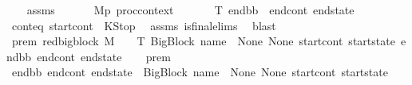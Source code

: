 \begin{isabellebody}
%
\isadelimproof
\ \ %
\endisadelimproof
%
\isatagproof
{}\isamarkupfalse%
\ assms\ \isanewline
{}\isamarkupfalse%
\ {\isacharminus}{\kern0pt}\isanewline
\ \ \isamarkupfalse%
\ M{\isacharcolon}{\kern0pt}{\isacharcolon}{\kern0pt}{\isachardoublequoteopen}{\isacharprime}{\kern0pt}p\ proc{\isacharunderscore}{\kern0pt}context{\isachardoublequoteclose}\isanewline
\ \ \isamarkupfalse%
\ {\isasymLambda}\ {\isasymGamma}\ {\isasymOmega}\ T\ end{\isacharunderscore}{\kern0pt}bb\ \ end{\isacharunderscore}{\kern0pt}cont\ end{\isacharunderscore}{\kern0pt}state\isanewline
\ \ \isamarkupfalse%
\ cont{\isacharunderscore}{\kern0pt}eq{\isacharcolon}{\kern0pt}\ {\isachardoublequoteopen}start{\isacharunderscore}{\kern0pt}cont\ {\isacharequal}{\kern0pt}\ KStop{\isachardoublequoteclose}\ \isamarkupfalse%
\ assms\ is{\isacharunderscore}{\kern0pt}final{\isachardot}{\kern0pt}elims{\isacharparenleft}{\kern0pt}{}{\isacharparenright}{\kern0pt}\ \isamarkupfalse%
\ blast\ \ \isanewline
\ \ \isamarkupfalse%
\ prem{}{\isacharcolon}{\kern0pt}\ {\isachardoublequoteopen}{\isacharparenleft}{\kern0pt}red{\isacharunderscore}{\kern0pt}bigblock\ M\ {\isasymLambda}\ {\isasymGamma}\ {\isasymOmega}\ T\ {\isacharparenleft}{\kern0pt}{\isacharparenleft}{\kern0pt}BigBlock\ name\ {\isacharbrackleft}{\kern0pt}{\isacharbrackright}{\kern0pt}\ None\ None{\isacharparenright}{\kern0pt}{\isacharcomma}{\kern0pt}\ start{\isacharunderscore}{\kern0pt}cont{\isacharcomma}{\kern0pt}\ start{\isacharunderscore}{\kern0pt}state{\isacharparenright}{\kern0pt}\ {\isacharparenleft}{\kern0pt}end{\isacharunderscore}{\kern0pt}bb{\isacharcomma}{\kern0pt}\ end{\isacharunderscore}{\kern0pt}cont{\isacharcomma}{\kern0pt}\ end{\isacharunderscore}{\kern0pt}state{\isacharparenright}{\kern0pt}{\isacharparenright}{\kern0pt}{\isachardoublequoteclose}\isanewline
\ \ \isamarkupfalse%
\ prem{}\ \isamarkupfalse%
\ {\isachardoublequoteopen}{\isacharparenleft}{\kern0pt}{\isacharparenleft}{\kern0pt}end{\isacharunderscore}{\kern0pt}bb{\isacharcomma}{\kern0pt}\ end{\isacharunderscore}{\kern0pt}cont{\isacharcomma}{\kern0pt}\ end{\isacharunderscore}{\kern0pt}state{\isacharparenright}{\kern0pt}\ {\isacharequal}{\kern0pt}\ {\isacharparenleft}{\kern0pt}{\isacharparenleft}{\kern0pt}BigBlock\ name\ {\isacharbrackleft}{\kern0pt}{\isacharbrackright}{\kern0pt}\ None\ None{\isacharparenright}{\kern0pt}{\isacharcomma}{\kern0pt}\ start{\isacharunderscore}{\kern0pt}cont{\isacharcomma}{\kern0pt}\ start{\isacharunderscore}{\kern0pt}state{\isacharparenright}{\kern0pt}{\isacharparenright}{\kern0pt}{\isachardoublequoteclose}\ \isamarkupfalse%

\end{isabellebody}
